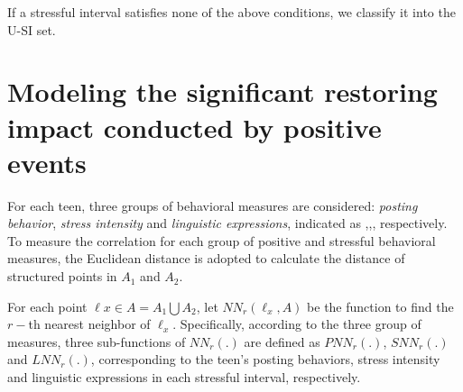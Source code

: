 If a stressful interval satisfies none of the above conditions, we classify it into the U-SI set.

\section{Modeling the significant restoring impact conducted by positive events}
\label{mod:mod1}
For each teen, three groups of behavioral measures are considered: \emph{posting behavior},
\emph{stress intensity} and \emph{linguistic expressions},
indicated as ,,, respectively.
To measure the correlation for each group of positive and stressful behavioral measures,
the Euclidean distance is adopted to calculate the distance of structured points in $A_1$ and $A_2$.

For each point $\ell x \in A=A_1\bigcup A_2$,
let $NN_r(\ell_x,A)$ be the function to find the $r-$th nearest neighbor of $\ell_x$.
Specifically, according to the three group of measures,
three sub-functions of $NN_r(.)$ are defined as $PNN_r(.)$, $SNN_r(.)$ and $LNN_r(.)$,
corresponding to the teen's posting behaviors, stress intensity and linguistic expressions in each stressful interval,  respectively.

